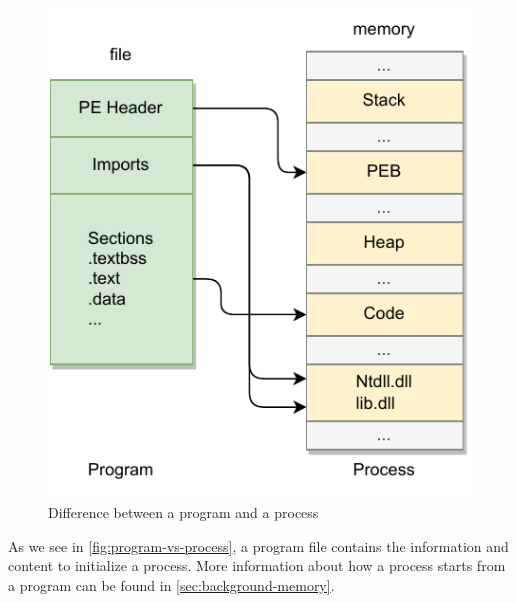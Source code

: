 \documentclass[a4paper, 11pt, english]{report}
\begin{document}
\begin{figure}[h]
%                
\centerline{\includegraphics{images/program-vs-process.drawio.pdf}}
	\caption{Difference between a program and a process}
	\label{fig:program-vs-process}
\end{figure}

As we see in \autoref{fig:program-vs-process}, a program file contains the information and content to initialize a process.
More information about how a process starts from a program can be found in \autoref{sec:background-memory}.
\end{document}
